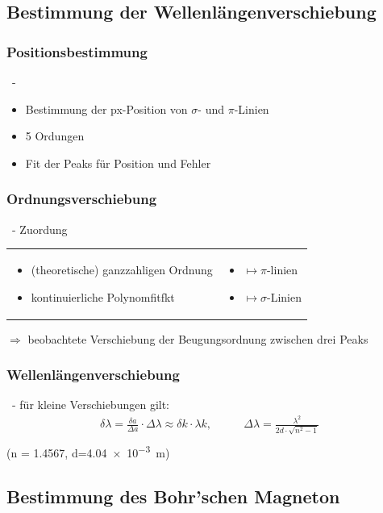   \subsection{Bestimmung der Wellenlängenverschiebung}
    \subsubsection{Positionsbestimmung}
      \begin{myframe}{\subsecname\ - \subsubsecname}
        \begin{itemize}
            \item Bestimmung der px-Position von $\sigma$- und $\pi$-Linien
            \item 5 Ordungen
            \item Fit der Peaks für Position und Fehler
        \end{itemize}
      \end{myframe}

    \subsubsection{Ordnungsverschiebung}
      \begin{myframe}{\subsecname\ - \subsubsecname}
        Zuordung
        \begin{tabular}{p{}p{}}
          \begin{itemize}
            \item (theoretische) ganzzahligen Ordnung
            \item kontinuierliche Polynomfitfkt
          \end{itemize} &
          \begin{itemize}
            \item[] $\mapsto \pi$-linien
            \item[] $\mapsto \sigma$-Linien
          \end{itemize} \\
        \end{tabular}
        $\Rightarrow$ beobachtete Verschiebung der Beugungsordnung zwischen drei Peaks
      \end{myframe}

    \subsubsection{Wellenlängenverschiebung}
      \begin{myframe}{\subsecname\ - \subsubsecname}
        für kleine Verschiebungen gilt:
        \begin{align}
          \delta\lambda = \frac{\delta a}{\Delta a}\cdot \Delta\lambda\approx\delta k\cdot\lambda k,
          &\qquad\Delta\lambda = \frac{\lambda^2}{2d\cdot\sqrt{n^2-1}}\\
        \end{align}
        \scriptsize (n = \SI{1.4567}{}, d=\SI{4.04e-3}{m})
      \end{myframe}
  \subsection{Bestimmung des Bohr'schen Magneton}
